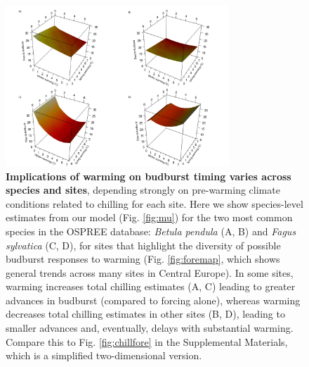\documentclass{article}
\begin{document}
\begin{figure}[h!]
\centering
\noindent \includegraphics[width=0.75\textwidth]{..//..//analyses/bb_analysis/figures/forecasting/tempforecastbothspp_1_7_degwarm3D_utah.png}
\caption{\textbf{Implications of warming on budburst timing varies across species and sites}, depending strongly on pre-warming climate conditions related to chilling for each site. Here we show species-level estimates from our model (Fig. \ref{fig:mu}) for the two most common species in the OSPREE database: \emph{Betula pendula} (A, B) and \emph{Fagus sylvatica} (C, D), for sites that highlight the diversity of possible budburst responses to warming (Fig. \ref{fig:foremap}, which shows general trends across many sites in Central Europe). In some sites, warming increases total chilling estimates (A, C) leading to greater advances in budburst (compared to forcing alone), whereas warming decreases total chilling estimates in other sites (B, D), leading to smaller advances and, eventually, delays with substantial warming. Compare this to Fig. \ref{fig:chillfore} in the Supplemental Materials, which is a simplified two-dimensional version.}
\label{fig:3dexpchillutah}
\end{figure}

\end{document}
